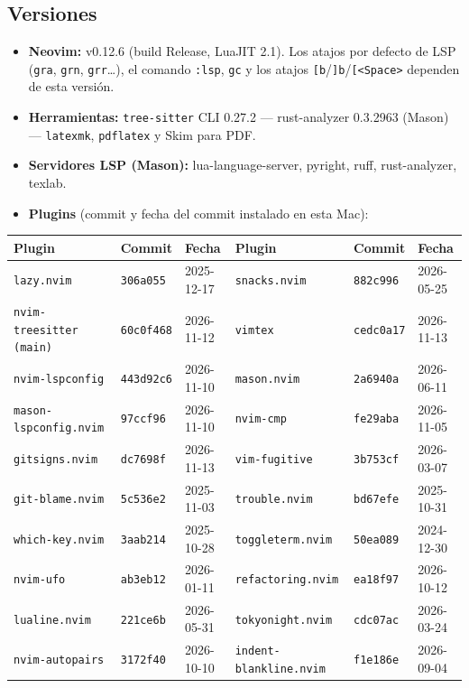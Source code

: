 \documentclass[8pt,a4paper,landscape]{extarticle}
\newcommand{\kk}[1]{\texttt{#1}}
\let\oldsubsection\subsection
\renewcommand{\subsection}{\Needspace{9\baselineskip}\oldsubsection}
\begin{document}
\subsection*{Versiones}
\begin{itemize}
  \item \textbf{Neovim:} v0.12.6 (build Release, LuaJIT 2.1). Los atajos por defecto de LSP (\kk{gra}, \kk{grn}, \kk{grr}\ldots), el comando \kk{:lsp}, \kk{gc} y los atajos \kk{[b}/\kk{]b}/\kk{[<Space>} dependen de esta versión.
  \item \textbf{Herramientas:} \kk{tree-sitter} CLI 0.27.2 --- rust-analyzer 0.3.2963 (Mason) --- \kk{latexmk}, \kk{pdflatex} y Skim para PDF.
  \item \textbf{Servidores LSP (Mason):} lua-language-server, pyright, ruff, rust-analyzer, texlab.
  \item \textbf{Plugins} (commit y fecha del commit instalado en esta Mac):
\end{itemize}
\begingroup\footnotesize
\begin{center}
\begin{tabular}{@{}lll@{\hspace{2em}}lll@{}}
\toprule
\textbf{Plugin} & \textbf{Commit} & \textbf{Fecha} & \textbf{Plugin} & \textbf{Commit} & \textbf{Fecha} \\
\midrule
\texttt{lazy.nvim} & \texttt{306a055} & 2025-12-17 & \texttt{snacks.nvim} & \texttt{882c996} & 2026-05-25 \\
\texttt{nvim-treesitter (main)} & \texttt{60c0f468} & 2026-11-12 & \texttt{vimtex} & \texttt{cedc0a17} & 2026-11-13 \\
\texttt{nvim-lspconfig} & \texttt{443d92c6} & 2026-11-10 & \texttt{mason.nvim} & \texttt{2a6940a} & 2026-06-11 \\
\texttt{mason-lspconfig.nvim} & \texttt{97ccf96} & 2026-11-10 & \texttt{nvim-cmp} & \texttt{fe29aba} & 2026-11-05 \\
\texttt{gitsigns.nvim} & \texttt{dc7698f} & 2026-11-13 & \texttt{vim-fugitive} & \texttt{3b753cf} & 2026-03-07 \\
\texttt{git-blame.nvim} & \texttt{5c536e2} & 2025-11-03 & \texttt{trouble.nvim} & \texttt{bd67efe} & 2025-10-31 \\
\texttt{which-key.nvim} & \texttt{3aab214} & 2025-10-28 & \texttt{toggleterm.nvim} & \texttt{50ea089} & 2024-12-30 \\
\texttt{nvim-ufo} & \texttt{ab3eb12} & 2026-01-11 & \texttt{refactoring.nvim} & \texttt{ea18f97} & 2026-10-12 \\
\texttt{lualine.nvim} & \texttt{221ce6b} & 2026-05-31 & \texttt{tokyonight.nvim} & \texttt{cdc07ac} & 2026-03-24 \\
\texttt{nvim-autopairs} & \texttt{3172f40} & 2026-10-10 & \texttt{indent-blankline.nvim} & \texttt{f1e186e} & 2026-09-04 \\
\bottomrule
\end{tabular}
\end{center}
\endgroup
\end{document}
